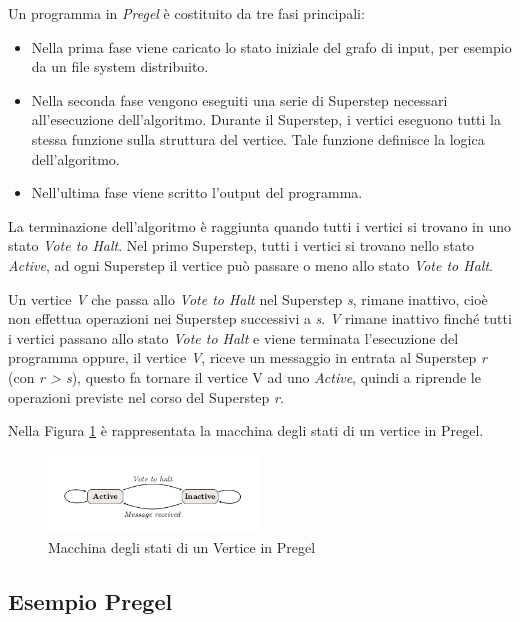 \documentclass[LaM,binding=0.6cm]{sapthesis}
\begin{document}
Un programma  in \textit{Pregel} è costituito da tre fasi principali: 
\begin{itemize}

\item Nella prima fase viene caricato lo stato iniziale del grafo di input, per esempio da un file system distribuito. 
\item Nella seconda fase vengono eseguiti una serie di Superstep necessari all'esecuzione dell'algoritmo. Durante il Superstep, i vertici eseguono tutti la stessa funzione sulla struttura del vertice. Tale funzione definisce la logica dell'algoritmo.
\item Nell'ultima fase viene scritto l’output del programma. 
\end{itemize}
La terminazione dell'algoritmo è raggiunta quando tutti i vertici si trovano in uno stato \textit{Vote to Halt}. Nel primo Superstep, tutti i vertici si trovano nello stato \textit{Active}, ad ogni Superstep il vertice può  passare o meno allo stato \textit{Vote to Halt}.

Un vertice \textit{V} che passa allo \textit{Vote to Halt} nel Superstep \textit{s}, rimane inattivo, cioè non effettua operazioni nei Superstep successivi a \textit{s}. \textit{V} rimane inattivo finché tutti i vertici passano allo stato \textit{Vote to Halt} e viene terminata l’esecuzione del programma oppure, il vertice \textit{V},  riceve un messaggio in entrata al Superstep \textit{r} (con \textit{r > s}), questo fa tornare il vertice V ad uno \textit{Active}, quindi a riprende le operazioni previste nel corso del Superstep \textit{r}.

Nella Figura \ref{fig:msPregel} è rappresentata la macchina degli stati di un vertice in Pregel.

\begin{figure}
\centering
\includegraphics[width=0.5\textwidth]{macchinastatipregel}
\caption{Macchina degli stati di un Vertice in Pregel}
\label{fig:msPregel}
\end{figure}

\subsection{Esempio Pregel}
 
\end{document}

